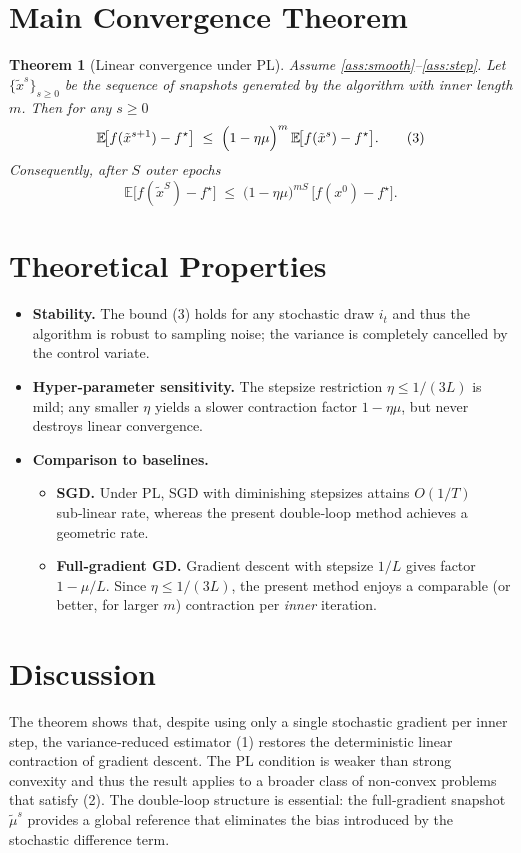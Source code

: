 \documentclass[11pt]{article}
\newtheorem{theorem}{Theorem}
\newcommand{\E}{\mathbb{E}}
\begin{document}
\section*{Main Convergence Theorem}
\begin{theorem}[Linear convergence under PL]\label{thm:linear}
Assume \ref{ass:smooth}–\ref{ass:step}. Let $\{\tilde{x}^{s}\}_{s\ge0}$ be the sequence of snapshots generated by the algorithm with inner length $m$. Then for any $s\ge0$
\[
\E\!\bigl[f(\tilde{x}^{s+1})-f^{\star}\bigr]
\;\le\;
\Bigl(1-\eta\mu\Bigr)^{m}\,\E\!\bigl[f(\tilde{x}^{s})-f^{\star}\bigr].
\tag{3}
\]
Consequently, after $S$ outer epochs
\[
\E\!\bigl[f(\tilde{x}^{S})-f^{\star}\bigr]
\;\le\;
\bigl(1-\eta\mu\bigr)^{mS}\,\bigl[f(x^{0})-f^{\star}\bigr].
\]
\end{theorem}

\section*{Theoretical Properties}
\begin{itemize}
\item \textbf{Stability.} The bound (3) holds for any stochastic draw $i_t$ and thus the algorithm is robust to sampling noise; the variance is completely cancelled by the control variate.
\item \textbf{Hyper‑parameter sensitivity.} The stepsize restriction $\eta\le 1/(3L)$ is mild; any smaller $\eta$ yields a slower contraction factor $1-\eta\mu$, but never destroys linear convergence.
\item \textbf{Comparison to baselines.}
    \begin{itemize}
    \item \textbf{SGD.} Under PL, SGD with diminishing stepsizes attains $O(1/T)$ sub‑linear rate, whereas the present double‑loop method achieves a geometric rate.
    \item \textbf{Full‑gradient GD.} Gradient descent with stepsize $1/L$ gives factor $1-\mu/L$. Since $\eta\le 1/(3L)$, the present method enjoys a comparable (or better, for larger $m$) contraction per \emph{inner} iteration.
    \end{itemize}
\end{itemize}

\section*{Discussion}
The theorem shows that, despite using only a single stochastic gradient per inner step, the variance‑reduced estimator (1) restores the deterministic linear contraction of gradient descent. The PL condition is weaker than strong convexity and thus the result applies to a broader class of non‑convex problems that satisfy (2). The double‑loop structure is essential: the full‑gradient snapshot $\tilde{\mu}^{s}$ provides a global reference that eliminates the bias introduced by the stochastic difference term.
\end{document}
